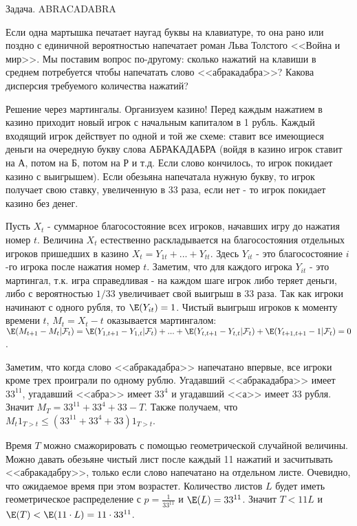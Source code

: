 {Задача. ABRACADABRA \cite{ross:scp}\cite{williams:pwm} 

Если одна мартышка печатает наугад буквы на клавиатуре, то она рано или поздно с единичной вероятностью напечатает роман Льва Толстого <<Война и мир>>. Мы поставим вопрос по-другому: сколько нажатий на клавиши в среднем потребуется чтобы напечатать слово <<абракадабра>>? Какова дисперсия требуемого количества нажатий?

Решение через мартингалы.  Организуем казино! Перед каждым нажатием в казино приходит
новый игрок с начальным капиталом в 1 рубль. Каждый входящий игрок
действует по одной и той же схеме: ставит все имеющиеся деньги на
очередную букву слова АБРАКАДАБРА (войдя в казино игрок ставит на А, потом на Б, потом на Р и т.д. Если слово кончилось, то игрок покидает казино с выигрышем). Если обезьяна напечатала нужную букву, то игрок получает свою ставку, увеличенную в 33 раза, если нет - то игрок покидает казино без денег. 

Пусть $X_{t}$ - суммарное благосостояние всех игроков, начавших игру до нажатия номер $t$. Величина $X_{t}$ естественно раскладывается на благосостояния отдельных игроков пришедших в казино $X_{t}=Y_{1t}+...+Y_{tt}$. Здесь $Y_{it}$ - это благосостояние $i$-го игрока после нажатия номер $t$. Заметим, что для каждого игрока $Y_{it}$ - это мартингал, т.к. игра справедливая - на каждом шаге игрок либо теряет деньги, либо с вероятностью $1/33$ увеличивает свой выигрыш в 33 раза. Так как игроки начинают с одного рубля, то $\E(Y_{it})=1$. Чистый выигрыш игроков к моменту времени $t$, $M_{t}=X_{t}-t$ оказывается мартингалом: $\E(M_{t+1}-M_{t}|\mathcal{F}_{t})=\E(Y_{1,t+1}-Y_{1,t}|\mathcal{F}_{t})+...+\E(Y_{t,t+1}-Y_{t,t}|\mathcal{F}_{t})+\E(Y_{t+1,t+1}-1|\mathcal{F}_{t})=0$.

Заметим, что когда слово <<абракадабра>> напечатано впервые, все игроки кроме трех проиграли по одному рублю. Угадавший <<абракадабра>> имеет $33^{11}$, угадавший <<абра>> имеет $33^{4}$ и угадавший <<а>> имеет $33$ рубля. Значит $M_{T}=33^{11}+33^{4}+33-T$. Также получаем, что $M_{t}1_{T>t}\leq (33^{11}+33^{4}+33)1_{T>t}$.

Время $T$ можно смажорировать с помощью геометрической случайной величины. Можно давать обезьяне чистый лист после каждый 11 нажатий и засчитывать <<абракадабру>>, только если слово напечатано на отдельном листе. Очевидно, что ожидаемое время при этом возрастет. Количество листов $L$ будет иметь геометрическое распределение с $p=\frac{1}{33^{11}}$ и $\E(L)=33^{11}$. Значит $T<11L$ и $\E(T)<\E(11\cdot L)=11\cdot 33^{11}$. 

}
